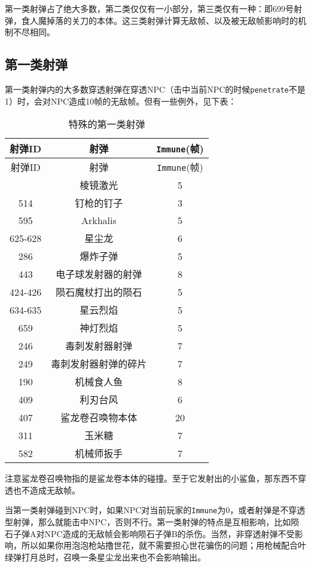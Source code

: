 第一类射弹占了绝大多数，第二类仅仅有一小部分，第三类仅有一种：即699号射弹，食人魔掉落的关刀的本体。这三类射弹计算无敌帧、以及被无敌帧影响时的机制不尽相同。

\subsection{第一类射弹}
第一类射弹内的大多数穿透射弹在穿透NPC（击中当前NPC的时候\lstinline{penetrate}不是1）时，会对NPC造成10帧的无敌帧。但有一些例外，见下表：
\begin{longtable}{|c|c|c|}
\caption{特殊的第一类射弹}\\ \hline
射弹ID&射弹&{\lstinline!Immune!}(帧)\\ \hline
\endfirsthead
\hline 射弹ID&射弹&{\lstinline!Immune!}(帧)\\\hline
\endhead
\hline
\endfoot
632 & 棱镜激光 & 5 \\ \hline
514 & 钉枪的钉子 & 3 \\ \hline
595 & Arkhalis & 5 \\ \hline
625-628 & 星尘龙 & 6 \\ \hline
286 & 爆炸子弹 & 5 \\ \hline
443 & 电子球发射器的射弹 & 8 \\ \hline
424-426 & 陨石魔杖打出的陨石 & 5 \\ \hline
634-635 & 星云烈焰 & 5 \\ \hline
659 & 神灯烈焰 & 5 \\ \hline
246 & 毒刺发射器射弹 & 7 \\ \hline
249 & 毒刺发射器射弹的碎片 & 7 \\ \hline
190 & 机械食人鱼 & 8 \\ \hline
409 & 利刃台风 & 6 \\ \hline
407 & 鲨龙卷召唤物本体 & 20 \\ \hline
311 & 玉米糖 & 7 \\ \hline
582 & 机械师扳手 & 7
\end{longtable}

注意鲨龙卷召唤物指的是鲨龙卷本体的碰撞。至于它发射出的小鲨鱼，那东西不穿透也不造成无敌帧。

当第一类射弹碰到NPC时，如果NPC对当前玩家的\lstinline{Immune}为0，或者射弹是不穿透型射弹，那么就能击中NPC，否则不行。第一类射弹的特点是互相影响，比如陨石子弹A对NPC造成的无敌帧会影响陨石子弹B的杀伤。当然，非穿透射弹不受影响，所以如果你用泡泡枪站撸世花，就不需要担心世花骗伤的问题；用枪械配合叶绿弹打月总时，召唤一条星尘龙出来也不会影响输出。

